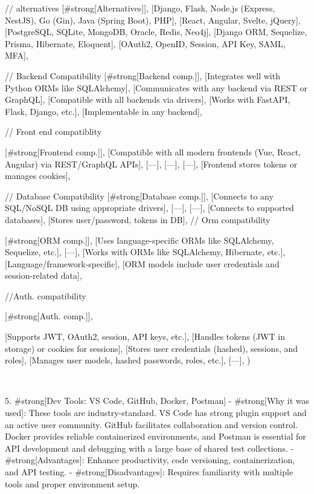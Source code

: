   // alternatives 
  [#strong[Alternatives]],
  [Django, Flask, Node.js (Express, NestJS), Go (Gin), Java (Spring Boot), PHP],
  [React, Angular, Svelte, jQuery],
  [PostgreSQL, SQLite, MongoDB, Oracle, Redis, Neo4j],
  [Django ORM, Sequelize, Prisma, Hibernate, Eloquent],
  [OAuth2, OpenID, Session, API Key, SAML, MFA],

  // Backend Compatibility 
  [#strong[Backend comp.]],
  [Integrates well with Python ORMs like SQLAlchemy],
  [Communicates with any backend via REST or GraphQL],
  [Compatible with all backends via drivers],
  [Works with FastAPI, Flask, Django, etc.],
  [Implementable in any backend],

  // Front end compatiblity 
  
  [#strong[Frontend comp.]],
  [Compatible with all modern frontends (Vue, React, Angular) via REST/GraphQL APIs],
  [—],
  [—],
  [—],
  [Frontend stores tokens or manages cookies],

  // Database Compatibility 
  [#strong[Database comp.]],
  [Connects to any SQL/NoSQL DB using appropriate drivers],
  [—],
  [—],
  [Connects to supported databases],
  [Stores user/password, tokens in DB],
  // Orm compatibility 
  
  [#strong[ORM comp.]],
  [Uses language-specific ORMs like SQLAlchemy, Sequelize, etc.],
  [—],
  [Works with ORMs like SQLAlchemy, Hibernate, etc.],
  [Language/framework-specific],
  [ORM models include user credentials and session-related data],

  //Auth. compatibility 
  
  [#strong[Auth. comp.]],
  
  [Supports JWT, OAuth2, session, API keys, etc.],
  [Handles tokens (JWT in storage) or cookies for sessions],
  [Stores user credentials (hashed), sessions, and roles],
  [Manages user models, hashed passwords, roles, etc.],
  [—],
)



\

5. #strong[Dev Tools: VS Code, GitHub, Docker, Postman]
- #strong[Why it was used]: These tools are industry-standard. VS Code has strong plugin support and an active user community. GitHub facilitates collaboration and version control. Docker provides reliable containerized environments, and Postman is essential for API development and debugging with a large base of shared test collections.
- #strong[Advantages]: Enhance productivity, code versioning, containerization, and API testing.
- #strong[Disadvantages]: Requires familiarity with multiple tools and proper environment setup.



